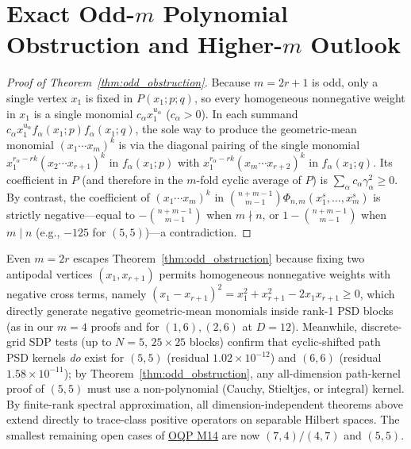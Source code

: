 \documentclass[11pt,a4paper]{article}
\theoremstyle{remark}
\begin{document}
\section{Exact Odd-$m$ Polynomial Obstruction and Higher-$m$ Outlook}

\begin{proof}[Proof of Theorem~\ref{thm:odd_obstruction}]
Because $m=2r+1$ is odd, only a single vertex $x_1$ is fixed in $P(x_1;p;q)$, so every homogeneous nonnegative weight in $x_1$ is a single monomial $c_\alpha x_1^{u_\alpha}$ ($c_\alpha > 0$). In each summand $c_\alpha x_1^{u_\alpha} f_\alpha(x_1;p) f_\alpha(x_1;q)$, the sole way to produce the geometric-mean monomial $(x_1\cdots x_m)^k$ is via the diagonal pairing of the single monomial $x_1^{r_\alpha - rk}(x_2\cdots x_{r+1})^k$ in $f_\alpha(x_1;p)$ with $x_1^{r_\alpha - rk}(x_m\cdots x_{r+2})^k$ in $f_\alpha(x_1;q)$. Its coefficient in $P$ (and therefore in the $m$-fold cyclic average of $P$) is $\sum_\alpha c_\alpha \gamma_\alpha^2 \ge 0$. By contrast, the coefficient of $(x_1\cdots x_m)^k$ in $\binom{n+m-1}{m-1}\Phi_{n,m}(x_1^s,\dots,x_m^s)$ is strictly negative---equal to $-\binom{n+m-1}{m-1}$ when $m\nmid n$, or $1-\binom{n+m-1}{m-1}$ when $m\mid n$ (e.g., $-125$ for $(5,5)$)---a contradiction.
\end{proof}

Even $m=2r$ escapes Theorem~\ref{thm:odd_obstruction} because fixing two antipodal vertices $(x_1, x_{r+1})$ permits homogeneous nonnegative weights with negative cross terms, namely $(x_1-x_{r+1})^2 = x_1^2+x_{r+1}^2-2x_1x_{r+1}\ge 0$, which directly generate negative geometric-mean monomials inside rank-1 PSD blocks (as in our $m=4$ proofs and for $(1,6),(2,6)$ at $D=12$). Meanwhile, discrete-grid SDP tests (up to $N=5$, $25\times 25$ blocks) confirm that cyclic-shifted path PSD kernels \emph{do} exist for $(5,5)$ (residual $1.02\times 10^{-12}$) and $(6,6)$ (residual $1.58\times 10^{-11}$); by Theorem~\ref{thm:odd_obstruction}, any all-dimension path-kernel proof of $(5,5)$ must use a non-polynomial (Cauchy, Stieltjes, or integral) kernel. By finite-rank spectral approximation, all dimension-independent theorems above extend directly to trace-class positive operators on separable Hilbert spaces. The smallest remaining open cases of \href{https://openquantumproblems.com/p/M14}{OQP M14} are now $(7,4)/(4,7)$ and $(5,5)$.
\end{document}
